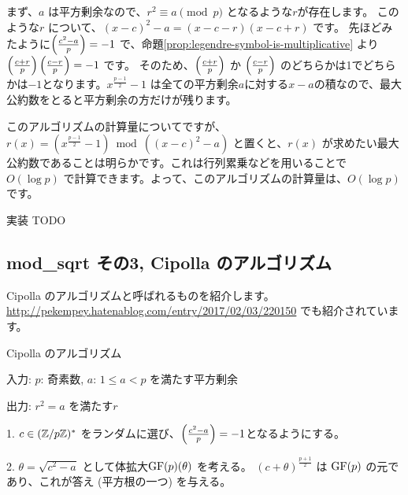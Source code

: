 \documentclass{jsarticle}
\begin{document}
  まず、$a$ は平方剰余なので、$r^2 \equiv a \pmod p$ となるような$r$が存在します。
  このような$r$ について、$(x-c)^2-a = (x - c -r) (x - c + r)$ です。
  先ほどみたように$\left(\frac{c^2-a}{p}\right) = -1$ で、命題\ref{prop:legendre-symbol-is-multiplicative} より$\left(\frac{c + r}{p}\right)\left(\frac{c - r}{p}\right) = -1$ です。
  そのため、$\left(\frac{c + r}{p}\right)$ か $\left(\frac{c - r}{p}\right)$ のどちらかは1でどちらかは$-1$となります。$x^{\frac{p-1}{2}}-1$ は全ての平方剰余$a$に対する$x-a$の積なので、最大公約数をとると平方剰余の方だけが残ります。

  このアルゴリズムの計算量についてですが、$r(x) = (x^{\frac{p-1}{2}} - 1) \bmod ((x-c)^2 - a)$ と置くと、$r(x)$ が求めたい最大公約数であることは明らかです。これは行列累乗などを用いることで $O(\log p)$ で計算できます。よって、このアルゴリズムの計算量は、$O(\log p)$です。

  実装 TODO
  \subsection{mod\_sqrt その3, Cipolla のアルゴリズム}
  Cipolla のアルゴリズムと呼ばれるものを紹介します。\url{http://pekempey.hatenablog.com/entry/2017/02/03/220150} でも紹介されています。

  \begin{algorithm}
   \caption{Cipolla のアルゴリズム}
   \label{alg:cipolla-mod-sqrt}
   入力: $p$: 奇素数, $a$: $1 \le a < p$ を満たす平方剰余

   出力: $r^2 = a$ を満たす$r$

   1. $c \in (\mathbb{Z}/p\mathbb{Z})^*$ をランダムに選び、$\left(\frac{c^2-a}{p}\right) = -1$となるようにする。

   2. $\theta = \sqrt{c^2-a}$ として体拡大$\mathrm{GF}(p)(\theta)$ を考える。
   $(c + \theta)^{\frac{p+1}{2}}$ は $\mathrm{GF}(p)$ の元であり、これが答え (平方根の一つ) を与える。
  \end{algorithm}
\end{document}
